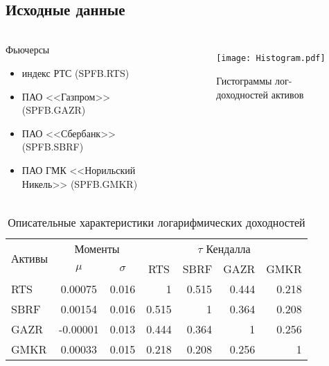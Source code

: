 \documentclass[aspectratio=169]{beamer}
\begin{document}
\subsection{Исходные данные}

\begin{frame}{\insertsection}
    \framesubtitle{\insertsubsection}
    \begin{columns}
        \begin{block}{Фьючерсы}
            \begin{itemize}
                \item индекс РТС (SPFB.RTS)
                \item ПАО {<<Газпром>>} (SPFB.GAZR)
                \item ПАО {<<Сбербанк>>} (SPFB.SBRF)
                \item ПАО ГМК {<<Норильский Никель>>} (SPFB.GMKR)
            \end{itemize}
        \end{block}
        \begin{figure}
            \centering
            \texttt{[image: Histogram.pdf]}
            \caption{Гистограммы лог-доходностей активов}
        \end{figure}
    \end{columns}
\end{frame}

\begin{frame}{\insertsection}
    \framesubtitle{\insertsubsection}
    \begin{table}
        \centering
        \caption{Описательные  характеристики логарифмических доходностей}
        \begin{adjustbox}{max width=\textwidth}
        \begin{tabular}{l|cc|rrrr}
            \toprule
            \multirow{2}{*}{Активы} & \multicolumn{2}{c|}{Моменты} & \multicolumn{4}{c}{$\tau$ Кендалла} \\
            & $\mu$ & $\sigma$ & \multicolumn{1}{c}{RTS} & \multicolumn{1}{c}{SBRF} & \multicolumn{1}{c}{GAZR} & \multicolumn{1}{c}{GMKR} \\ 
            \midrule
    RTS  &  0.00075 & 0.016 &     1 & 0.515 & 0.444 & 0.218 \\
    SBRF &  0.00154 & 0.016 & 0.515 &     1 & 0.364 & 0.208 \\
    GAZR & -0.00001 & 0.013 & 0.444 & 0.364 &     1 & 0.256 \\
    GMKR &  0.00033 & 0.015 & 0.218 & 0.208 & 0.256 &     1 \\    
            \bottomrule
        \end{tabular}
        \end{adjustbox}
    \end{table}
\end{frame}
\end{document}
